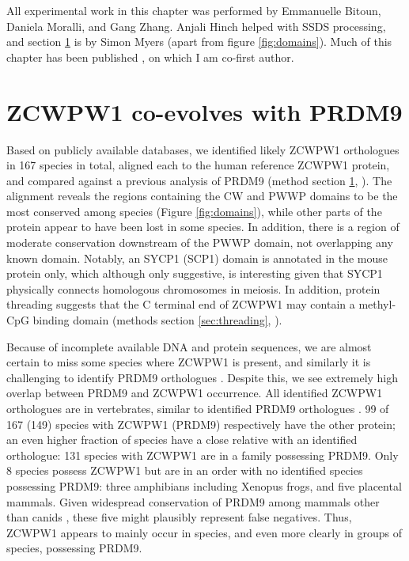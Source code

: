 \vspace{0.7cm}
\begin{framed}
\noindent All experimental work in this chapter was performed by Emmanuelle Bitoun, Daniela Moralli, and Gang Zhang.
Anjali Hinch helped with SSDS processing, and section \ref{sec:coevolution} is by Simon Myers (apart from figure \ref{fig:domains}).
Much of this chapter has been published \cite{Wells2020ZCWPW1}, on which I am co-first author.
\end{framed}

\section{ZCWPW1 co-evolves with PRDM9}
\label{sec:coevolution}
Based on publicly available databases, we identified likely ZCWPW1 orthologues in 167 species in total, aligned each to the human reference ZCWPW1 protein, and compared against a previous analysis of PRDM9 (method section \ref{sec:coevolution}, \cite{Baker2017Repeated}).
The alignment reveals the regions containing the CW and PWWP domains to be the most conserved among species (Figure \ref{fig:domains}), while other parts of the protein appear to have been lost in some species.
In addition, there is a region of moderate conservation downstream of the PWWP domain, not overlapping any known domain.
Notably, an SYCP1 (SCP1) domain is annotated in the mouse protein only, which although only suggestive, is interesting given that SYCP1 physically connects homologous chromosomes in meiosis.
In addition, protein threading suggests that the C terminal end of ZCWPW1 may contain a methyl-CpG binding domain (methods section \ref{sec:threading}, \cite{Lobley2009pGenTHREADER}).


Because of incomplete available DNA and protein sequences, we are almost certain to miss some species where ZCWPW1 is present, and similarly it is challenging to identify PRDM9 orthologues \parencite{Baker2017Repeated}.
Despite this, we see extremely high overlap between PRDM9 and ZCWPW1 occurrence.
All identified ZCWPW1 orthologues are in vertebrates, similar to identified PRDM9 orthologues \parencite{Baker2017Repeated}.
99 of 167 (149) species with ZCWPW1 (PRDM9) respectively have the other protein; an even higher fraction of species have a close relative with an identified orthologue: 131 species with ZCWPW1 are in a family possessing PRDM9.
Only 8 species possess ZCWPW1 but are in an order with no identified species possessing PRDM9: three amphibians including Xenopus frogs, and five placental mammals.
Given widespread conservation of PRDM9 among mammals other than canids \parencite{Baker2017Repeated}, these five might plausibly represent false negatives.
Thus, ZCWPW1 appears to mainly occur in species, and even more clearly in groups of species, possessing PRDM9.


